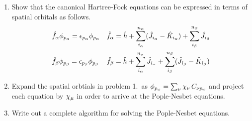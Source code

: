 \documentclass[11pt]{article}
\numberwithin{equation}{section}
\begin{document}
\begin{enumerate}
\item
  Show that the canonical Hartree-Fock equations can be expressed in terms of spatial orbitals as follows.
  \begin{align*}
  &
    \hat{f}_{\alpha } \phi _{p_{\alpha }}
  =
    \epsilon _{p_{\alpha }} \phi _{p_{\alpha }}
  &&
    \hat{f}_{\alpha }
  =
    \hat{h}
  +
    \sum_{i_{\alpha }}^{n_{\alpha }}
    (\hat{J}_{i_{\alpha }} - \hat{K}_{i_{\alpha }})
  +
    \sum_{i_{\beta }}^{n_{\beta }}
    \hat{J}_{i_{\beta }}
  \\
  &
    \hat{f}_{\beta } \phi _{p_{\beta }}
  =
    \epsilon _{p_{\beta }} \phi _{p_{\beta }}
  &&
    \hat{f}_{\beta }
  =
    \hat{h}
  +
    \sum_{i_{\alpha }}^{n_{\alpha }}
    \hat{J}_{i_{\alpha }}
  +
    \sum_{i_{\beta }}^{n_{\beta }}
    (\hat{J}_{i_{\beta }} - \hat{K}_{i_{\beta }})
  \end{align*}

\item
  Expand the spatial orbtials in problem 1.~as
  $
    \f_{p_\w}
  =
    \sum_\nu
    \x_\nu\,
    C_{\nu p_\w}
  $
  and project each equation by $\x_\mu$ in order to arrive at the Pople-Nesbet equations.

\item
  Write out a complete algorithm for solving the Pople-Nesbet equations.
\end{enumerate}
\end{document}
